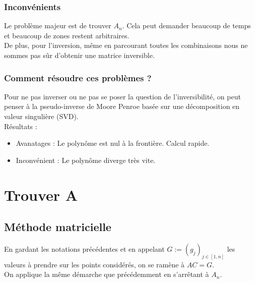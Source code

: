 \documentclass{article}
\begin{document}
	\subsubsection*{Inconvénients}
	Le problème majeur est de trouver $A_n$. Cela peut demander beaucoup de temps et beaucoup de zones restent arbitraires.\\
	De plus, pour l'inversion, même en parcourant toutes les combinaisons nous ne sommes pas sûr d'obtenir une matrice inversible.

	\subsubsection*{Comment résoudre ces problèmes ?}
	Pour ne pas inverser ou ne pas se poser la question de l'inversibilité, on peut penser à la pseudo-inverse de Moore Penroe basée sur une décomposition en valeur singulière (SVD).\\
	Résultats :
	\begin{itemize}
		\item Avanatages : Le polynôme est nul à la frontière. Calcul rapide.
		\item Inconvénient :  Le polynôme diverge très vite.
	\end{itemize}

	\section{Trouver A}
	\subsection{Méthode matricielle}
	En gardant les notations précédentes et en appelant $G:=(g_j)_{j\in[1,n]}$ les valeurs à prendre sur les points considérés, on se ramène à $AC=G$.\\
	On applique la même démarche que précédemment en s'arrêtant à $A_n$.
\end{document}
